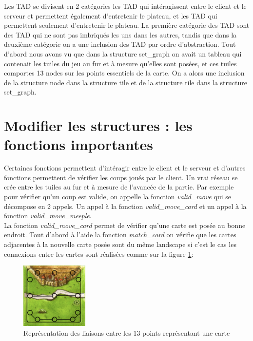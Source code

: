 \documentclass[12pt]{article}
\begin{document}
Les TAD se divisent en 2 catégories les TAD qui intéragissent entre le client et le serveur et permettent également d'entretenir le plateau, et les TAD qui permettent seulement d'entretenir le plateau. La première catégorie des TAD sont des TAD qui ne sont pas imbriqués les uns dans les autres, tandis que dans la deuxième catégorie on a une inclusion des TAD par ordre d'abstraction.
Tout d'abord nous avons vu que dans la structure set\_graph on avait un tableau qui contenait les tuiles du jeu au fur et à mesure qu'elles sont posées, et ces tuiles comportes 13 nodes sur les points essentiels de la carte. On a alors une inclusion de la structure node dans la structure tile et de la structure tile dans la structure set\_graph.

\section{Modifier les structures : les fonctions importantes}

Certaines fonctions permettent d'intéragir entre le client et le serveur et d'autres fonctions permettent de vérifier les coups joués par le client. Un vrai réseau se crée entre les tuiles au fur et à mesure de l'avancée de la partie. Par exemple pour vérifier qu'un coup est valide, on appelle la fonction \textit{valid\_move} qui se décompose en 2 appels. Un appel à la fonction \textit{valid\_move\_card} et un appel à la fonction \textit{valid\_move\_meeple}.\\

La fonction \textit{valid\_move\_card} permet de vérifier qu'une carte est posée au bonne endroit. Tout d'abord à l'aide la fonction \textit{match\_card} on vérifie que les cartes adjacentes à la nouvelle carte posée sont du même landscape si c'est le cas les connexions entre les cartes sont réalisées comme sur la figure \ref{b}:

\begin{figure}[!h]
\begin{center}
\includegraphics[width=0.3\textwidth]{carte2.png}
\end{center}
\caption{Représentation des liaisons entre les 13 points représentant une carte} \label{b}
\end{figure}
\end{document}
